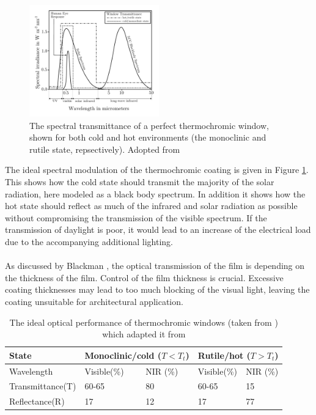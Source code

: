 \begin{figure}[h!]
  \centering
   \includegraphics[width=0.5\textwidth]{Figures/TCWtransmittanceMcCluney1996andKamali2013.pdf}
   \caption{The spectral transmittance of a perfect thermochromic window, shown for both 
   cold and hot environments (the monoclinic and rutile state, repsectively). 
   Adopted from \cite[p.~15]{McCluney1996} %
   }
   \label{fig:idealTCW}
\end{figure}
The ideal spectral modulation of the thermochromic coating is given in Figure \ref{fig:idealTCW}.
This shows how the cold state should transmit the majority of the solar radiation, here modeled
as a black body spectrum. In addition it shows how the hot state should reflect as much 
of the infrared and solar radiation as possible without compromising the transmission of the 
visible spectrum. If the transmission of daylight is poor, it would 
lead to an increase of the electrical load due to the accompanying additional lighting.
\cite{McCluney1996}
\\
\\
As discussed by Blackman \cite[p.~4569]{Blackman2009},
the optical transmission of the film is depending on the thickness of the film. Control of the film
thickness is crucial. Excessive coating thicknesses may lead to too much blocking of the visual light,
leaving the coating unsuitable for architectural application.
%
%
\begin{table}[htbp]
   \caption{The ideal optical performance of thermochromic windows (taken from \cite{Kamalisarvestani2013})
   which adapted it from \cite{Saeli2010}}
\centering
\begin{tabular}{ l l l l l}
\hline
\textbf{State}  &  \multicolumn{2}{l}{\textbf{Monoclinic/cold ($T<T_t$)}}  &  \multicolumn{2}{l}{\textbf{Rutile/hot ($T>T_t$)}} \\
\hline
Wavelength      &  Visible(\%)    &  NIR (\%)      &  Visible(\%)    &  NIR (\%) \\
Transmittance(T)&  60-65          &  80            &  60-65          &  15       \\
Reflectance(R)  &  17             &  12            &  17             &  77       \\
\hline
\end{tabular}
\label{tab:idealTCW}
\end{table}

